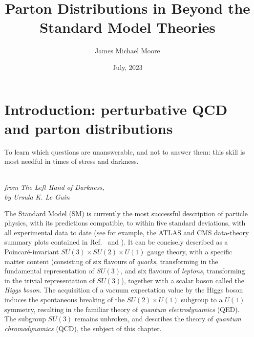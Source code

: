 \documentclass[withindex,glossary]{cam-thesis}
\title{Parton Distributions in Beyond the Standard Model Theories}
\author{James Michael Moore}
\date{July, 2023}
\begin{document}
\frontmatter{}



\chapter{Introduction: perturbative QCD and parton distributions}

\epigraph{To learn which questions are unanswerable, and not to answer them: this skill is most needful in times of stress and darkness.}{\textit{\\ from The Left Hand of Darkness, \\ by Ursula K. Le Guin}}

The Standard Model (SM) is currently the most successful description of particle physics, with its predictions compatible, to within five standard deviations, with all experimental data to date (see for example, the ATLAS and CMS data-theory summary plots contained in Ref.~\cite{ATLAS:2022djm} and \cite{Ghosh:2019vqm}). It can be concisely described as a Poincar\'{e}-invariant $SU(3) \times SU(2) \times U(1)$ gauge theory, with a specific matter content (consisting of six flavours of \textit{quarks}, transforming in the fundamental representation of $SU(3)$, and six flavours of \textit{leptons}, transforming in the trivial representation of $SU(3)$), together with a scalar boson called the \textit{Higgs boson}. The acquisition of a vacuum expectation value by the Higgs boson induces the spontaneous breaking of the $SU(2) \times U(1)$ subgroup to a $U(1)$ symmetry, resulting in the familiar theory of \textit{quantum electrodynamics} (QED). The subgroup $SU(3)$ remains unbroken, and describes the theory of \textit{quantum chromodynamics} (QCD), the subject of this chapter.
\end{document}
